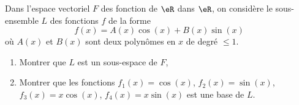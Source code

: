\begin{exercice}\label{exoLineraire0027}

	Dans l'espace vectoriel $F$ des fonction de $\eR$ dans $\eR$, on considère le sous-ensemble $L$ des fonctions $f$ de la forme
	\begin{equation}
		f(x)=A(x)\cos(x)+B(x)\sin(x)
	\end{equation}
	où $A(x)$ et $B(x)$ sont deux polynômes en $x$ de degré $\leq 1$.
	\begin{enumerate}

		\item
			Montrer que $L$ est un sous-espace de $F$,
		\item
			Montrer que les fonctions $f_1(x)=\cos(x)$, $f_2(x)=\sin(x)$, $f_3(x)=x\cos(x)$, $f_4(x)=x\sin(x)$ est une base de $L$.

	\end{enumerate}

\end{exercice}
